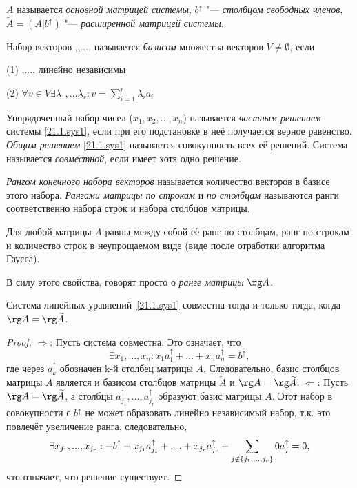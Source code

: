 $A$ называется \textit{основной матрицей системы}, $b^\uparrow$ "--- \textit{столбцом свободных членов}, $\widetilde A = (A|b^\uparrow)$ "--- \textit{расширенной матрицей системы}.
\begin{defn}
Набор векторов ,,..., называется \textit{базисом} множества векторов $V\neq \emptyset$, если

(1) ,..., линейно независимы

(2) $\forall v \in V \exists \lambda_1,...\lambda_r: v=\sum \limits_{i=1}^r\lambda_ia_i$
\end{defn}

\begin{defn}
Упорядоченный набор чисел ($x_1, x_2, \ldots, x_n$) называется \textit{частным решением} системы \eqref{21.1.sys1}, если при его подстановке в неё получается верное равенство. \textit{Общим решением} \eqref{21.1.sys1} называется совокупность всех её решений. Система называется \textit{совместной}, если имеет хотя одно решение.
\end{defn}
\begin{defn}
\textit{Рангом конечного набора векторов} называется количество векторов в базисе этого набора. \textit{Рангами матрицы по строкам} и \textit{по столбцам} называются ранги соответственно набора строк и набора столбцов матрицы.
\end{defn}
\begin{lemm} 
Для любой матрицы $A$ равны между собой её ранг по столбцам, ранг по строкам и количество строк в неупрощаемом виде (виде после отработки алгоритма Гаусса).
\end{lemm}
В силу этого свойства, говорят просто о \textit{ранге матрицы} $\rg A$.
\begin{thm}
Система линейных уравнений~\eqref{21.1.sys1} совместна тогда и только тогда, когда $\rg A = \rg \widetilde A$.
\end{thm}
\begin{proof}
$\Rightarrow$: Пусть система совместна. Это означает, что
\begin{equation*}
\exists x_1,\ldots, x_n: x_1a_1^\uparrow +\ldots+x_na_n^\uparrow=b^\uparrow,
\end{equation*}
где через $a_k^\uparrow$ обозначен k-й столбец матрицы $A$. Следовательно, базис столбцов матрицы $A$  является и базисом столбцов матрицы $\widetilde A$ и $\rg A = \rg \widetilde A$.
$\Leftarrow$: Пусть $\rg A = \rg \widetilde A$, а столбцы $a_{j_1}^\uparrow,...,a_{j_r}^\uparrow$ образуют базис матрицы $A$. Этот набор в совокупности с $b^\uparrow$ не может образовать линейно независимый набор, т.к. это повлечёт увеличение ранга, следовательно, 
\begin{equation*}\\ 
\exists x_{j_1},...,x_{j_r}: -b^\uparrow+x_{j_1}a_{j_1}^\uparrow+\ldots+x_{j_r}a_{j_r}^\uparrow+\sum_{j \notin \{j_1,...,j_r\}}0 a_j^\uparrow = 0,
\end{equation*} 
что означает, что решение существует.
\end{proof}
